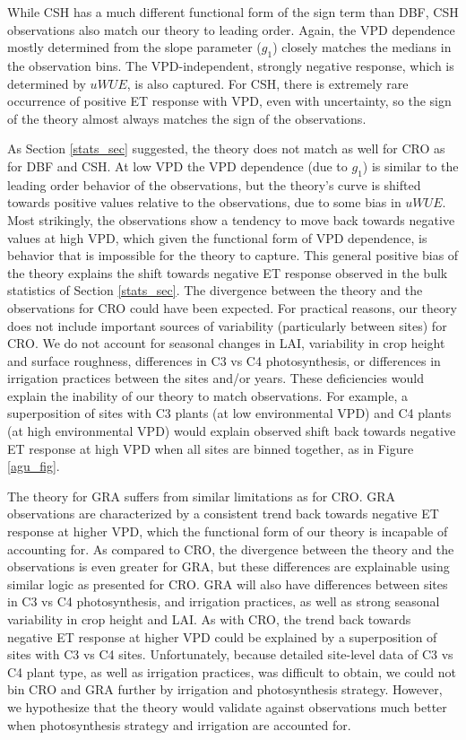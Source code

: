 \documentclass[draft,linenumbers]{agujournal}
\begin{document}
While CSH has a much different functional form of the sign term than DBF, CSH observations also match our theory to leading order. Again, the VPD dependence mostly determined from the slope parameter ($g_1$) closely matches the medians in the observation bins. The VPD-independent, strongly negative response, which is determined by $uWUE$, is also captured. For CSH, there is extremely rare occurrence of positive ET response with VPD, even with uncertainty, so the sign of the theory almost always matches the sign of the observations.

As Section \ref{stats_sec} suggested, the theory does not match as well for CRO as for DBF and CSH. At low VPD the VPD dependence (due to $g_1$) is similar to the leading order behavior of the observations, but the theory's curve is shifted towards positive values relative to the observations, due to some bias in $uWUE$. Most strikingly, the observations show a tendency to move back towards negative values at high VPD, which given the functional form of VPD dependence, is behavior that is impossible for the theory to capture. This general positive bias of the theory explains the shift towards negative ET response observed in the bulk statistics of Section \ref{stats_sec}. The divergence between the theory and the observations for CRO could have been expected. For practical reasons, our theory does not include important sources of variability (particularly between sites) for CRO. We do not account for seasonal changes in LAI, variability in crop height and surface roughness, differences in C3 vs C4 photosynthesis, or differences in irrigation practices between the sites and/or years. These deficiencies would explain the inability of our theory to match observations. For example, a superposition of sites with C3 plants (at low environmental VPD) and C4 plants (at high environmental VPD) would explain observed shift back towards negative ET response at high VPD when all sites are binned together, as in Figure \ref{agu_fig}.  

The theory for GRA suffers from similar limitations as for CRO. GRA observations are characterized by a consistent trend back towards negative ET response at higher VPD, which the functional form of our theory is incapable of accounting for. As compared to CRO, the divergence between the theory and the observations is even greater for GRA, but these differences are explainable using similar logic as presented for CRO. GRA will also have differences between sites in C3 vs C4 photosynthesis, and irrigation practices, as well as strong seasonal variability in crop height and LAI. As with CRO, the trend back towards negative ET response at higher VPD could be explained by a superposition of sites with C3 vs C4 sites. Unfortunately, because detailed site-level data of C3 vs C4 plant type, as well as irrigation practices, was difficult to obtain, we could not bin CRO and GRA further by irrigation and photosynthesis strategy. However, we hypothesize that the theory would validate against observations much better when photosynthesis strategy and irrigation are accounted for. 
\end{document}
